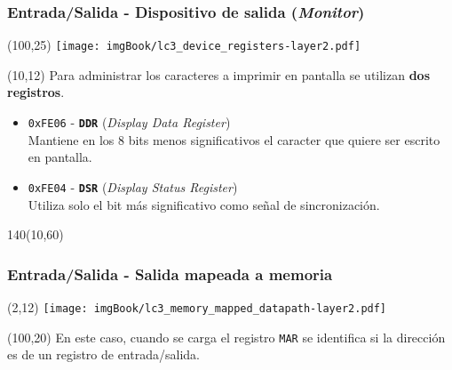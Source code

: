 \documentclass[aspectratio=169]{beamer}
\begin{document}
\begin{frame}[t,fragile]
    \frametitle{Entrada/Salida - Dispositivo de salida (\emph{Monitor})}
    \begin{textblock}{65}(100,25) \texttt{[image: imgBook/lc3\_device\_registers-layer2.pdf]} \end{textblock}
    \begin{textblock}{75}(10,12)
    Para administrar los caracteres a imprimir en pantalla se utilizan \textbf{dos registros}.\\
    \bigskip
    \begin{itemize}
     \item<2-> \textcolor{naranjauca}{\texttt{0xFE06}} - \textbf{\texttt{DDR}} (\emph{Display Data Register})\\
     Mantiene en los 8 bits menos significativos el caracter que quiere ser escrito en pantalla.
     \item<3-> \textcolor{naranjauca}{\texttt{0xFE04}} - \textbf{\texttt{DSR}} (\emph{Display Status Register})\\
     Utiliza solo el bit más significativo como señal de sincronización.
    \end{itemize}
    \end{textblock}
    \begin{textblock}{140}(10,60)
    \bigskip
    \end{textblock}
\end{frame}

\begin{frame}[t,fragile]
    \frametitle{Entrada/Salida - Salida mapeada a memoria}
    \begin{textblock}{65}(2,12) \texttt{[image: imgBook/lc3\_memory\_mapped\_datapath-layer2.pdf]} \end{textblock}
    \begin{textblock}{50}(100,20)
    En este caso, cuando se carga el registro \texttt{MAR} \textcolor{verdeuca}{se identifica si la dirección es de un registro de entrada/salida.}\\
    \bigskip
    \end{textblock}
\end{frame}
\end{document}
